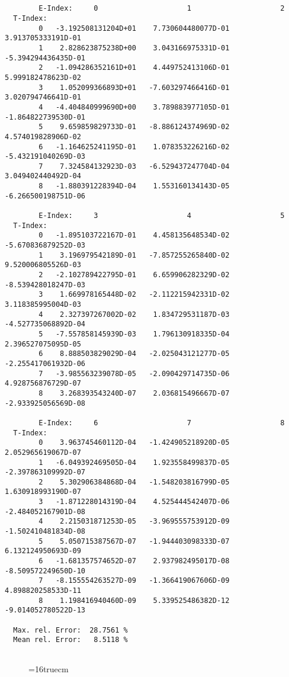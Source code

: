 \documentclass[12pt,dvipdfmx]{article}
\begin{document}
\begin{small}\begin{verbatim}


        E-Index:     0                     1                     2
  T-Index:
        0   -3.192508131204D+01    7.730604480077D-01    3.913705333191D-01
        1    2.828623875238D+00    3.043166975331D-01   -5.394294436435D-01
        2   -1.094286352161D+01    4.449752413106D-01    5.999182478623D-02
        3    1.052099366893D+01   -7.603297466416D-01    3.020794746641D-01
        4   -4.404840999690D+00    3.789883977105D-01   -1.864822739530D-01
        5    9.659859829733D-01   -8.886124374969D-02    4.574019828906D-02
        6   -1.164625241195D-01    1.078353226216D-02   -5.432191040269D-03
        7    7.324584132923D-03   -6.529437247704D-04    3.049402440492D-04
        8   -1.880391228394D-04    1.553160134143D-05   -6.266500198751D-06

        E-Index:     3                     4                     5
  T-Index:
        0   -1.895103722167D-01    4.458135648534D-02   -5.670836879252D-03
        1    3.196979542189D-01   -7.857255265840D-02    9.520006805526D-03
        2   -2.102789422795D-01    6.659906282329D-02   -8.539428018247D-03
        3    1.669978165448D-02   -2.112215942331D-02    3.118385995004D-03
        4    2.327397267002D-02    1.834729531187D-03   -4.527735068892D-04
        5   -7.557858145939D-03    1.796130918335D-04    2.396527075095D-05
        6    8.888503829029D-04   -2.025043121277D-05   -2.255417061932D-06
        7   -3.985563239078D-05   -2.090429714735D-06    4.928756876729D-07
        8    3.268393543240D-07    2.036815496667D-07   -2.933925056569D-08

        E-Index:     6                     7                     8
  T-Index:
        0    3.963745460112D-04   -1.424905218920D-05    2.052965619067D-07
        1   -6.049392469505D-04    1.923558499837D-05   -2.397863109992D-07
        2    5.302906384868D-04   -1.548203816799D-05    1.630918993190D-07
        3   -1.871228014319D-04    4.525444542407D-06   -2.484052167901D-08
        4    2.215031871253D-05   -3.969555753912D-09   -1.502410481834D-08
        5    5.050715387567D-07   -1.944403098333D-07    6.132124950693D-09
        6   -1.681357574652D-07    2.937982495017D-08   -8.509572249650D-10
        7   -8.155554263527D-09   -1.366419067606D-09    4.898820258533D-11
        8    1.198416940460D-09    5.339525486382D-12   -9.014052780522D-13

  Max. rel. Error:  28.7561 %
  Mean rel. Error:   8.5118 %


\end{verbatim}\end{small}
\begin{figure} \label{2.3.2d}
\epsfxsize=16truecm
\end{figure}
\newpage
\end{document}
